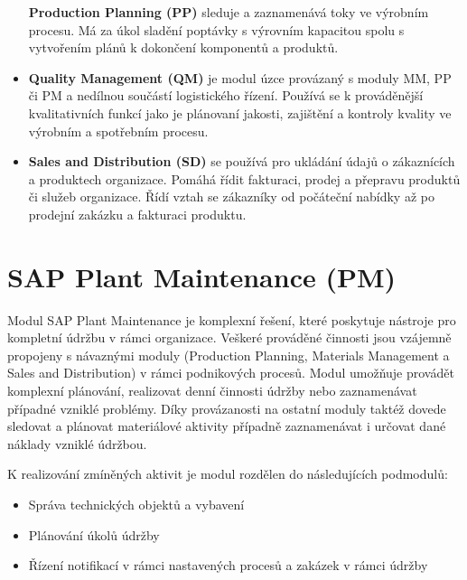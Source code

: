 \documentclass[thesis=M,czech]{FITthesis}[2012/06/26]
\begin{document}
\begin{itemize}
	\textbf{Production Planning (PP)} sleduje a zaznamenává toky ve výrobním procesu. Má za úkol sladění poptávky s výrovním kapacitou spolu s vytvořením plánů k dokončení komponentů a produktů.
	\item
	\textbf{Quality Management (QM)} je modul úzce provázaný s moduly MM, PP či PM a nedílnou součástí logistického řízení. Používá se k prováděnější kvalitativních funkcí jako je plánovaní jakosti, zajištění a kontroly kvality ve výrobním a spotřebním procesu.
	\item
	\textbf{Sales and Distribution (SD)} se používá pro ukládání údajů o zákaznících a produktech organizace. Pomáhá řídit fakturaci, prodej a přepravu produktů či služeb organizace. Řídí vztah se zákazníky od počáteční nabídky až po prodejní zakázku a fakturaci produktu.   
\end{itemize} 	

\section{SAP Plant Maintenance (PM)}
Modul SAP Plant Maintenance je komplexní řešení, které poskytuje nástroje pro kompletní údržbu v rámci organizace. Veškeré prováděné činnosti jsou vzájemně propojeny s návaznými moduly (Production Planning, Materials Management a Sales and Distribution) v rámci podnikových procesů. Modul umožňuje provádět komplexní plánování, realizovat denní činnosti údržby nebo zaznamenávat případné vzniklé problémy. Díky provázanosti na ostatní moduly taktéž dovede sledovat a plánovat materiálové aktivity případně zaznamenávat i určovat dané náklady vzniklé údržbou.

K realizování zmíněných aktivit je modul rozdělen do následujících podmodulů:
\begin{itemize}
	\item
	Správa technických objektů a vybavení
	\item
	Plánování úkolů údržby
	\item
	Řízení notifikací v rámci nastavených procesů a zakázek v rámci údržby
\end{itemize} 	
\end{document}
